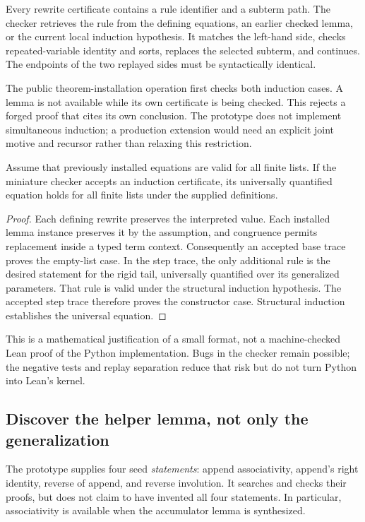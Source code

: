 Every rewrite certificate contains a rule identifier and a subterm path. The
checker retrieves the rule from the defining equations, an earlier checked
lemma, or the current local induction hypothesis. It matches the left-hand
side, checks repeated-variable identity and sorts, replaces the selected
subterm, and continues. The endpoints of the two replayed sides must be
syntactically identical.

The public theorem-installation operation first checks both induction cases.
A lemma is not available while its own certificate is being checked. This
rejects a forged proof that cites its own conclusion. The prototype does not
implement simultaneous induction; a production extension would need an
explicit joint motive and recursor rather than relaxing this restriction.

\begin{proposition}
Assume that previously installed equations are valid for all finite lists.
If the miniature checker accepts an induction certificate, its universally
quantified equation holds for all finite lists under the supplied definitions.
\end{proposition}
\begin{proof}
Each defining rewrite preserves the interpreted value. Each installed lemma
instance preserves it by the assumption, and congruence permits replacement
inside a typed term context. Consequently an accepted base trace proves the
empty-list case. In the step trace, the only additional rule is the desired
statement for the rigid tail, universally quantified over its generalized
parameters. That rule is valid under the structural induction hypothesis.
The accepted step trace therefore proves the constructor case. Structural
induction establishes the universal equation.
\end{proof}

This is a mathematical justification of a small format, not a machine-checked
Lean proof of the Python implementation. Bugs in the checker remain possible;
the negative tests and replay separation reduce that risk but do not turn
Python into Lean's kernel.

\subsection{Discover the helper lemma, not only the generalization}

The prototype supplies four seed \emph{statements}: append associativity,
append's right identity, reverse of append, and reverse involution. It searches
and checks their proofs, but does not claim to have invented all four
statements. In particular, associativity is available when the accumulator
lemma is synthesized.

